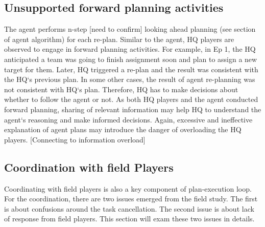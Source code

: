 \subsection{Unsupported forward planning activities}
The agent performs n-step [need to confirm] looking ahead planning (see section of agent algorithm) for each re-plan. Similar to the agent, HQ players are observed to engage in forward planning activities. For example, in Ep 1, the HQ anticipated a team was going to finish assignment soon and plan to assign a new target for them. Later, HQ triggered a re-plan and the result was consistent with the HQ`s previous plan. In some other cases, the result of agent re-planning was not consistent with HQ`s plan. Therefore, HQ has to make decisions about whether to follow the agent or not. As both HQ players and the agent conducted forward planning, sharing of relevant information may help HQ to understand the agent`s reasoning and make informed decisions.  Again, excessive and ineffective explanation of agent plans may introduce the danger of overloading the HQ players.  [Connecting to information overload]

\subsection{Coordination with field Players}
Coordinating with field players is also a key component of plan-execution loop. For the coordination, there are two issues emerged from the field study. The first is about confusions around the task cancellation. The second issue is about lack of response from field players. This section will exam these two issues in details.\\


